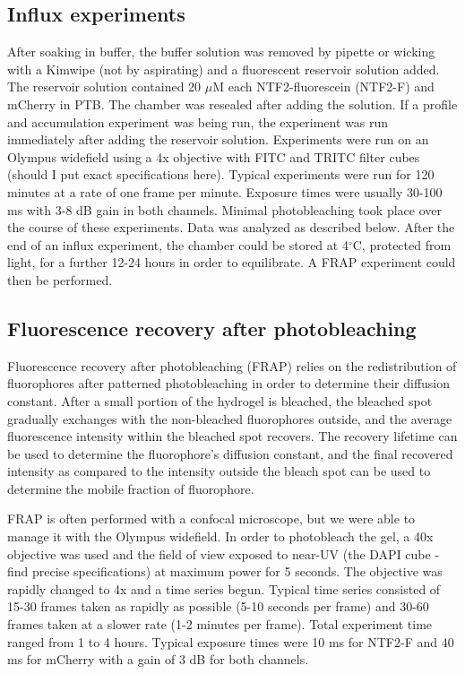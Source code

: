 \subsection{Influx experiments}
After soaking in buffer, the buffer solution was removed by pipette or wicking with a Kimwipe (not by aspirating) and a fluorescent reservoir solution added.  The reservoir solution contained 20 $\mu$M each NTF2-fluorescein (NTF2-F) and mCherry in PTB.  The chamber was resealed after adding the solution.  If a profile and accumulation experiment was being run, the experiment was run immediately after adding the reservoir solution.  Experiments were run on an Olympus widefield using a 4x objective with FITC and TRITC filter cubes (should I put exact specifications here).  Typical experiments were run for 120 minutes at a rate of one frame per minute.  Exposure times were usually 30-100 ms with 3-8 dB gain in both channels.  Minimal photobleaching took place over the course of these experiments.  Data was analyzed as described below.  After the end of an influx experiment, the chamber could be stored at 4$^\circ$C, protected from light, for a further 12-24 hours in order to equilibrate.  A FRAP experiment could then be performed.

\subsection{Fluorescence recovery after photobleaching}
Fluorescence recovery after photobleaching (FRAP) relies on the redistribution of fluorophores after patterned photobleaching in order to determine their diffusion constant.  After a small portion of the hydrogel is bleached, the bleached spot gradually exchanges with the non-bleached fluorophores outside, and the average fluorescence intensity within the bleached spot recovers.  The recovery lifetime can be used to determine the fluorophore's diffusion constant, and the final recovered intensity as compared to the intensity outside the bleach spot can be used to determine the mobile fraction of fluorophore.

FRAP is often performed with a confocal microscope, but we were able to manage it with the Olympus widefield.  In order to photobleach the gel, a 40x objective was used and the field of view exposed to near-UV (the DAPI cube - find precise specifications) at maximum power for 5 seconds.  The objective was rapidly changed to 4x and a time series begun.  Typical time series consisted of 15-30 frames taken as rapidly as possible (5-10 seconds per frame) and 30-60 frames taken at a slower rate (1-2 minutes per frame).  Total experiment time ranged from 1 to 4 hours.  Typical exposure times were 10 ms for NTF2-F and 40 ms for mCherry with a gain of 3 dB for both channels.

